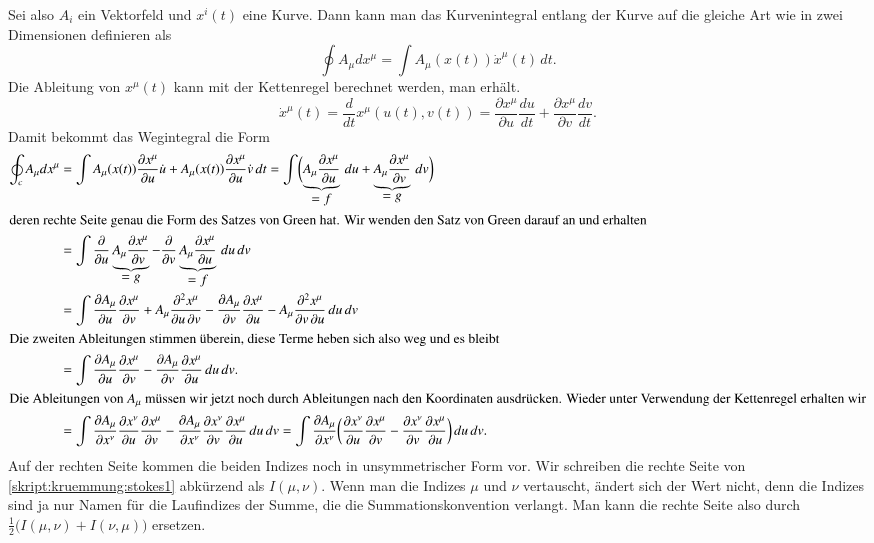 Sei also $A_i$ ein Vektorfeld und $x^i(t)$ eine Kurve.
Dann kann man das Kurvenintegral entlang der Kurve auf die gleiche Art
wie in zwei Dimensionen definieren als
\[
\oint A_\mu dx^\mu = \int A_\mu(x(t)) \dot x^\mu(t)\,dt.
\]
Die Ableitung von $x^\mu(t)$ kann mit der Kettenregel berechnet
werden, man erhält.
\[
\dot x^\mu(t)
=
\frac{d}{dt} x^\mu(u(t), v(t))
=
\frac{\partial x^\mu}{\partial u} \frac{du}{dt}
+
\frac{\partial x^\mu}{\partial v} \frac{dv}{dt}.
\]
Damit bekommt das Wegintegral die Form
\begin{align}
\oint_c A_\mu dx^\mu
&=
\int
A_\mu(x(t))
\frac{\partial x^\mu}{\partial u}\dot u
+
A_\mu(x(t))
\frac{\partial x^\mu}{\partial u}\dot v
\,dt
=
\int
\biggl(
\underbrace{A_\mu \frac{\partial x^\mu}{\partial u}}_{\displaystyle=f}\,du
+
\underbrace{A_\mu \frac{\partial x^\mu}{\partial v}}_{\displaystyle=g}\,dv
\biggr)
\notag
\\
\intertext{%
deren rechte Seite genau die Form des Satzes von Green hat.
Wir wenden den Satz von Green darauf an und erhalten}
&=
\int
\frac{\partial}{\partial u}
\underbrace{A_\mu\frac{\partial x^\mu}{\partial v}}_{\displaystyle=g}
-
\frac{\partial}{\partial v}
\underbrace{A_\mu\frac{\partial x^\mu}{\partial u}}_{\displaystyle=f}
\,du\,dv
\notag
\\
&=
\int
\frac{\partial A_\mu}{\partial u}\frac{\partial x^\mu}{\partial v}
+A_\mu\frac{\partial^2 x^\mu}{\partial u\,\partial v}
-
\frac{\partial A_\mu}{\partial v}\frac{\partial x^\mu}{\partial u}
-A_\mu\frac{\partial^2 x^\mu}{\partial v\,\partial u}
\,du\,dv
\notag
\\
\intertext{Die zweiten Ableitungen stimmen überein, diese Terme heben
sich also weg und es bleibt}
&=
\int
\frac{\partial A_\mu}{\partial u}\frac{\partial x^\mu}{\partial v}
-
\frac{\partial A_\mu}{\partial v}\frac{\partial x^\mu}{\partial u}
\,du\,dv.
\notag
\\
\intertext{Die Ableitungen von $A_\mu$ müssen wir jetzt noch durch
Ableitungen nach den Koordinaten ausdrücken.
Wieder unter Verwendung der Kettenregel erhalten wir}
&=
\int
\frac{\partial A_\mu}{\partial x^\nu}\frac{\partial x^\nu}{\partial u}\frac{\partial x^\mu}{\partial v}
-
\frac{\partial A_\mu}{\partial x^\nu}\frac{\partial x^\nu}{\partial v}\frac{\partial x^\mu}{\partial u}
\,du\,dv
=
\int
\frac{\partial A_\mu}{\partial x^\nu}
\biggl(\frac{\partial x^\nu}{\partial u}\frac{\partial x^\mu}{\partial v}
-
\frac{\partial x^\nu}{\partial v}\frac{\partial x^\mu}{\partial u}
\biggr)
\,du\,dv.
\label{skript:kruemmung:stokes1}
\end{align}
Auf der rechten Seite kommen die beiden Indizes noch in unsymmetrischer
Form vor.
Wir schreiben die rechte Seite von \eqref{skript:kruemmung:stokes1}
abkürzend als $I(\mu,\nu)$.
Wenn man die Indizes $\mu$ und $\nu$ vertauscht, ändert sich der Wert nicht,
denn die Indizes sind ja nur Namen für die Laufindizes der Summe, die
die Summationskonvention verlangt.
Man kann die rechte Seite also durch
$\frac12\bigl(I(\mu,\nu)+I(\nu,\mu)\bigr)$
ersetzen.

